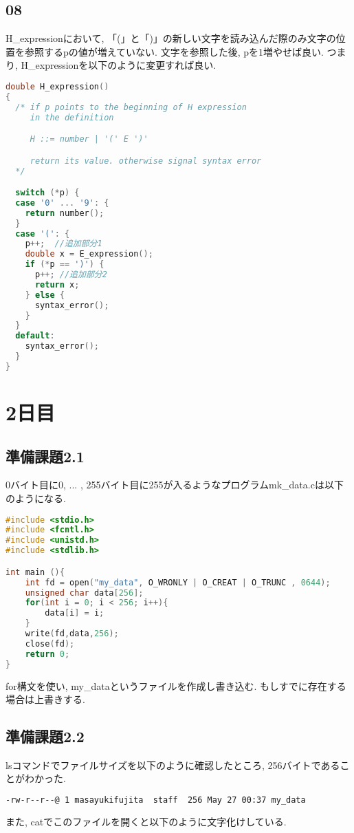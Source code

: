 \documentclass{ltjsarticle}
\begin{document}
\subsection{08}
H\_expressionにおいて, 「(」と「)」の新しい文字を読み込んだ際のみ文字の位置を参照するpの値が増えていない. 文字を参照した後, pを1増やせば良い. つまり, H\_expressionを以下のように変更すれば良い. 
\begin{lstlisting}[caption=p08.c 変更部分, language=C]
double H_expression() 
{
  /* if p points to the beginning of H expression
     in the definition 

     H ::= number | '(' E ')'

     return its value. otherwise signal syntax error
  */

  switch (*p) {
  case '0' ... '9': {
    return number();
  }
  case '(': {
    p++;  //追加部分1
    double x = E_expression();
    if (*p == ')') {
      p++; //追加部分2
      return x;
    } else {
      syntax_error();
    }
  }
  default:
    syntax_error();
  }
}
\end{lstlisting}

\section{2日目}
\subsection{準備課題2.1}
0バイト目に0, ... , 255バイト目に255が入るようなプログラムmk\_data.cは以下のようになる. 
\begin{lstlisting}[caption=mk\_data.c,language=C]
#include <stdio.h>
#include <fcntl.h>
#include <unistd.h>
#include <stdlib.h>

int main (){
    int fd = open("my_data", O_WRONLY | O_CREAT | O_TRUNC , 0644);
    unsigned char data[256];
    for(int i = 0; i < 256; i++){
        data[i] = i;
    }
    write(fd,data,256);
    close(fd);
    return 0;
}
\end{lstlisting}
for構文を使い, my\_dataというファイルを作成し書き込む. もしすでに存在する場合は上書きする. 
\subsection{準備課題2.2}
lsコマンドでファイルサイズを以下のように確認したところ, 256バイトであることがわかった. 
\begin{lstlisting}[caption=ファイルサイズの確認,language=bash]
% ls -l my_data
-rw-r--r--@ 1 masayukifujita  staff  256 May 27 00:37 my_data
\end{lstlisting}
また, catでこのファイルを開くと以下のように文字化けしている. 
\end{document}
